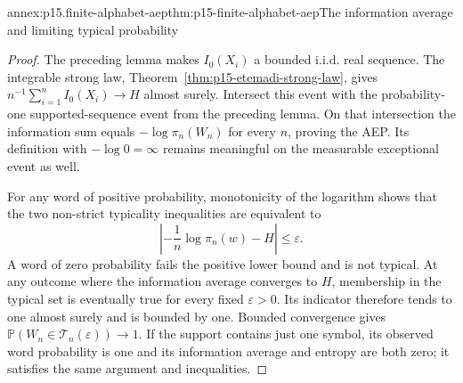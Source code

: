 \begin{annexitem}{annex:p15.finite-alphabet-aep}{thm:p15-finite-alphabet-aep}{The information average and limiting typical probability}
\begin{proof}
The preceding lemma makes \(I_0(X_i)\) a bounded i.i.d. real
sequence. The integrable strong law, Theorem~\ref{thm:p15-etemadi-strong-law}, gives
\(n^{-1}\sum_{i=1}^nI_0(X_i)\to H\) almost surely.
Intersect this event with the probability-one supported-sequence
event from the preceding lemma. On that intersection the information
sum equals \(-\log\pi_n(W_n)\) for every \(n\), proving the AEP.
Its definition with \(-\log0=\infty\) remains meaningful on the
measurable exceptional event as well.

For any word of positive probability, monotonicity of the logarithm
shows that the two non-strict typicality inequalities are equivalent to
\[
 \left|-\frac1n\log\pi_n(w)-H\right|\leq\varepsilon.
\]
A word of zero probability fails the positive lower bound and is
not typical. At any outcome where the information average converges
to \(H\), membership in the typical set is eventually true for
every fixed \(\varepsilon>0\). Its indicator therefore tends to one
almost surely and is bounded by one. Bounded convergence gives
\(\mathbb P(W_n\in\mathcal T_n(\varepsilon))\to1\).
If the support contains just one symbol, its observed word probability
is one and its information average and entropy are both zero; it
satisfies the same argument and inequalities.
\end{proof}
\end{annexitem}

